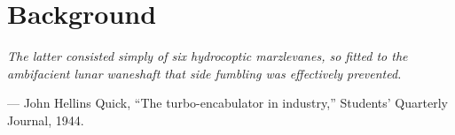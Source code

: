 \chapter{Background}
\label{chap:background}

\setlength{\epigraphwidth}{0.7\textwidth}
\epigraph{ \it
    The latter consisted simply of six hydrocoptic marzlevanes, so fitted to the ambifacient lunar waneshaft that side fumbling was effectively prevented.
}{--- John Hellins Quick, ``The turbo-encabulator in industry,'' Students' Quarterly Journal, 1944.}




